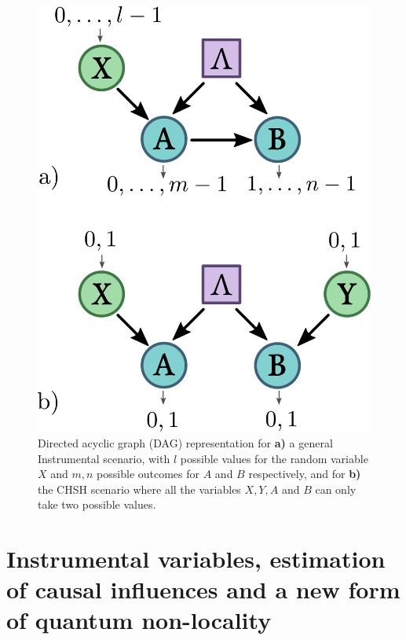 \documentclass[letterpaper]{article}
\begin{document}
\begin{figure}[t]
    \centering
    \includegraphics[width=.8\columnwidth]{images/chsh_inst_dag.pdf}
        \caption{
    Directed acyclic graph (DAG) representation for
    \textbf{a)} a general
    Instrumental scenario, with $l$ possible values for the random variable $X$
    and $m,n$ possible outcomes for $A$ and $B$ respectively, and for
    \textbf{b)} the CHSH scenario \cite{CHSH} where all the
    variables $X,Y,A$ and $B$ can only take two possible values.
}
    \label{fig:chshinstdag}

\end{figure} 

\section{Instrumental variables, estimation of causal influences and a new form of quantum non-locality}
\end{document}
